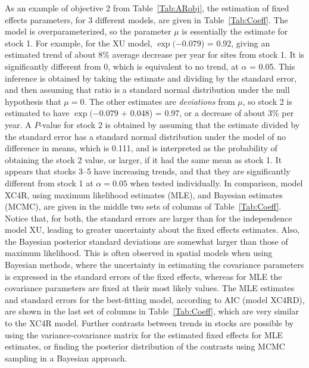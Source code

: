 As an example of objective 2 from Table~\ref{Tab:ARobj}, the estimation of fixed effects parameters, for 3 different models, are given in Table~\ref{Tab:Coeff}.  The model is overparameterized, so the parameter $\mu$ is essentially the estimate for stock 1. For example, for the XU model, $\exp($\ensuremath{-0.079}) = 0.92, giving an estimated trend of about 8\% average decrease per year for sites from stock 1. It is significantly different from 0, which is equivalent to no trend, at $\alpha$ = 0.05. This inference is obtained by taking the estimate and dividing by the standard error, and then assuming that ratio is a standard normal distribution under the null hypothesis that $\mu = 0$. The other estimates are \emph{deviations} from $\mu$, so stock 2 is estimated to have $\exp($\ensuremath{-0.079} + 0.048) = 0.97, or a decrease of about 3\% per year.  A $P$-value for stock 2 is obtained by assuming that the estimate divided by the standard error has a standard normal distribution under the model of no difference in means, which is 0.111, and is interpreted as the probability of obtaining the stock 2 value, or larger, if it had the same mean as stock 1.  It appears that stocks 3--5 have increasing trends, and that they are significantly different from stock 1 at $\alpha = 0.05$ when tested individually.  In comparison, model XC4R, using maximum likelihood estimates (MLE), and Bayesian estimates (MCMC), are given in the middle two sets of columns of Table~\ref{Tab:Coeff}.  Notice that, for both, the standard errors are larger than for the independence model XU, leading to greater uncertainty about the fixed effects estimates.  Also, the Bayesian posterior standard deviations are somewhat larger than those of maximum likelihood.  This is often observed in spatial models when using Bayesian methods, where the uncertainty in estimating the covariance parameters is expressed in the standard errors of the fixed effects, whereas for MLE the covariance parameters are fixed at their most likely values.  The MLE estimates and standard errors for the best-fitting model, according to AIC (model XC4RD), are shown in the last set of columns in Table~\ref{Tab:Coeff}, which are very similar to the XC4R model.  Further contrasts between trends in stocks are possible by using the variance-covariance matrix for the estimated fixed effects for MLE estimates, or finding the posterior distribution of the contrasts using MCMC sampling in a Bayesian approach.

